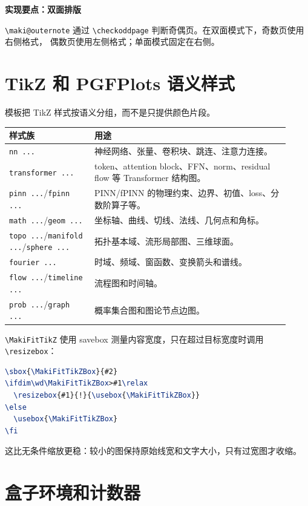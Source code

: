 \documentclass[a4paper,11pt]{ltxdoc}
\newcommand{\mcmd}[1]{\texttt{\textbackslash#1}}
\newcommand{\mkey}[1]{\texttt{#1}}
\newenvironment{implementation}[1]
  {\par\medskip\noindent\textbf{\color{MakiBlue}实现要点：#1}\par\smallskip}
  {\par\medskip}
\begin{document}
\begin{implementation}{双面排版}
\mcmd{maki@outernote} 通过 \mcmd{checkoddpage} 判断奇偶页。在双面模式下，奇数页使用右侧格式，
偶数页使用左侧格式；单面模式固定在右侧。
\end{implementation}

\section{TikZ 和 PGFPlots 语义样式}

模板把 TikZ 样式按语义分组，而不是只提供颜色片段。

\begin{longtable}{@{}p{0.28\linewidth}p{0.64\linewidth}@{}}
\toprule
样式族 & 用途 \\
\midrule
\mkey{nn ...} & 神经网络、张量、卷积块、跳连、注意力连接。\\
\mkey{transformer ...} & token、attention block、FFN、norm、residual flow 等 Transformer 结构图。\\
\mkey{pinn ...}/\mkey{fpinn ...} & PINN/fPINN 的物理约束、边界、初值、loss、分数阶算子等。\\
\mkey{math ...}/\mkey{geom ...} & 坐标轴、曲线、切线、法线、几何点和角标。\\
\mkey{topo ...}/\mkey{manifold ...}/\mkey{sphere ...} & 拓扑基本域、流形局部图、三维球面。\\
\mkey{fourier ...} & 时域、频域、窗函数、变换箭头和谱线。\\
\mkey{flow ...}/\mkey{timeline ...} & 流程图和时间轴。\\
\mkey{prob ...}/\mkey{graph ...} & 概率集合图和图论节点边图。\\
\bottomrule
\end{longtable}

\mcmd{MakiFitTikZ} 使用 savebox 测量内容宽度，只在超过目标宽度时调用 \mcmd{resizebox}：

\begin{lstlisting}[language=TeX]
\sbox{\MakiFitTikZBox}{#2}
\ifdim\wd\MakiFitTikZBox>#1\relax
  \resizebox{#1}{!}{\usebox{\MakiFitTikZBox}}
\else
  \usebox{\MakiFitTikZBox}
\fi
\end{lstlisting}

这比无条件缩放更稳：较小的图保持原始线宽和文字大小，只有过宽图才收缩。

\section{盒子环境和计数器}
\end{document}
